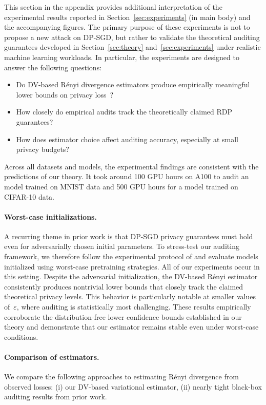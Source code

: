 \documentclass{article}
\theoremstyle{plain}
\theoremstyle{definition}
\theoremstyle{remark}
\begin{document}
This section in the appendix
provides additional interpretation of the experimental results reported in Section~\ref{sec:experiments} (in main body) 
and the accompanying figures.
The primary purpose of these experiments is not to propose a new attack on DP-SGD, but rather to validate the theoretical
auditing guarantees developed in Section~\ref{sec:theory} and~\ref{sec:experiments} under realistic machine learning workloads.
In particular, the experiments are designed to answer the following questions:

\begin{itemize}
    \item Do DV-based R\'enyi divergence estimators produce empirically meaningful lower bounds on privacy loss~\citep{Alabi26}?
    \item How closely do empirical audits track the theoretically claimed RDP guarantees?
    \item How does estimator choice affect auditing accuracy, especially at small privacy budgets?
\end{itemize}

Across all datasets and models, the experimental findings are consistent with the predictions of our theory. It took around 100 GPU hours on A100 to audit an model trained on MNIST data and 500 GPU hours for a model trained on CIFAR-10 data.

\paragraph{Worst-case initializations.}
A recurring theme in prior work is that DP-SGD privacy guarantees must hold even for adversarially chosen initial parameters.
To stress-test our auditing framework, we therefore follow the experimental protocol of
\cite{AD24, muthu2024nearly} and evaluate models initialized using worst-case pretraining strategies. All of our experiments occur in this setting.
Despite the adversarial initialization, the DV-based R\'enyi estimator consistently produces nontrivial lower bounds
that closely track the claimed theoretical privacy levels.
This behavior is particularly notable at smaller values of~$\varepsilon$, where auditing is statistically most challenging.
These results empirically corroborate the distribution-free lower confidence bounds established in our theory
and demonstrate that our estimator remains stable even under worst-case conditions.

\paragraph{Comparison of estimators.}
We compare the following approaches to estimating R\'enyi divergence from observed losses:
(i) our DV-based variational estimator,
(ii) nearly tight black-box auditing results from prior work.
\end{document}
